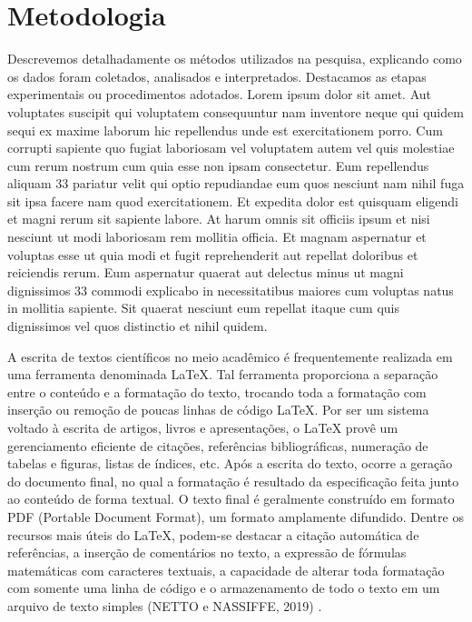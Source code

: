 \documentclass[12pt]{article}
\begin{document}
\section{Metodologia} %
Descrevemos detalhadamente os métodos utilizados na pesquisa, explicando como os dados foram coletados, analisados e interpretados. Destacamos as etapas experimentais ou procedimentos adotados. Lorem ipsum dolor sit amet. Aut voluptates suscipit qui voluptatem consequuntur nam inventore neque qui quidem sequi ex maxime laborum hic repellendus unde est exercitationem porro. Cum corrupti sapiente quo fugiat laboriosam vel voluptatem autem vel quis molestiae cum rerum nostrum cum quia esse non ipsam consectetur. Eum repellendus aliquam 33 pariatur velit qui optio repudiandae eum quos nesciunt nam nihil fuga sit ipsa facere nam quod exercitationem. Et expedita dolor est quisquam eligendi et magni rerum sit sapiente labore. At harum omnis sit officiis ipsum et nisi nesciunt ut modi laboriosam rem mollitia officia. Et magnam aspernatur et voluptas esse ut quia modi et fugit reprehenderit aut repellat doloribus et reiciendis rerum. Eum aspernatur quaerat aut delectus minus ut magni dignissimos 33 commodi explicabo in necessitatibus maiores cum voluptas natus in mollitia sapiente. Sit quaerat nesciunt eum repellat itaque cum quis dignissimos vel quos distinctio et nihil quidem.
\\
\begin{adjustwidth}{4cm}{0cm} %
  \fontsize{10}{12}\selectfont %
  \justifying %
  A escrita de textos científicos no meio acadêmico é frequentemente realizada em uma ferramenta denominada LaTeX. Tal ferramenta proporciona a separação entre o conteúdo e a formatação do texto, trocando toda a formatação com inserção ou remoção de poucas linhas de código LaTeX. Por ser um sistema voltado à escrita de artigos, livros e apresentações, o LaTeX provê um gerenciamento eficiente de citações, referências bibliográficas, numeração de tabelas e figuras, listas de índices, etc. Após a escrita do texto, ocorre a geração do documento final, no qual a formatação é resultado da especificação feita junto ao conteúdo de forma textual. O texto final é geralmente construído em formato PDF (Portable Document Format), um formato amplamente difundido. Dentre os recursos mais úteis do LaTeX, podem-se destacar a citação automática de referências, a inserção de comentários no texto, a expressão de fórmulas matemáticas com caracteres textuais, a capacidade de alterar toda formatação com somente uma linha de código e o armazenamento de todo o texto em um arquivo de texto simples (NETTO e NASSIFFE, 2019) \cite{netto2018introduccao}.
  \\
\end{adjustwidth}
\end{document}
